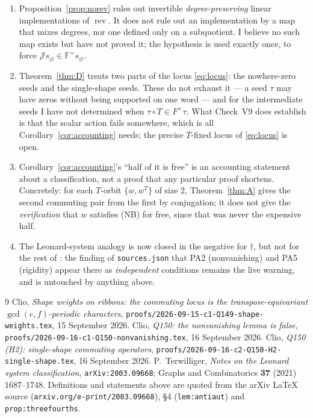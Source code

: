 \documentclass[11pt]{article}
\theoremstyle{definition}
\theoremstyle{remark}
\newcommand{\F}{\mathbb{F}}
\newcommand{\rev}{\operatorname{rev}}
\begin{document}
\begin{enumerate}
\item Proposition~\ref{prop:norev} rules out invertible \emph{degree-preserving} linear
implementations of $\rev$.  It does not rule out an implementation by a map that mixes
degrees, nor one defined only on a subquotient.  I believe no such map exists but have not
proved it; the hypothesis is used exactly once, to force $\mathcal J
s_\varnothing\in\F^\times s_\varnothing$.

\item Theorem~\ref{thm:D} treats two parts of the locus \eqref{eq:locus}: the nowhere-zero
seeds and the single-shape seeds.  These do not exhaust it --- a seed $\tau$ may have zeros
without being supported on one word --- and for the intermediate seeds I have not determined
when $\tau\circ T\in F^{\times}\tau$.  What Check~V9 does establish is that the scalar action
fails somewhere, which is all Corollary~\ref{cor:accounting} needs; the precise
$T$-fixed locus of \eqref{eq:locus} is open.

\item Corollary~\ref{cor:accounting}'s ``half of it is free'' is an accounting statement
about a classification, not a proof that any particular proof shortens.  Concretely: for each
$T$-orbit $\{w,w^{T}\}$ of size $2$, Theorem~\ref{thm:A} gives the second commuting pair from
the first by conjugation; it does not give the \emph{verification} that $w$ satisfies (NB) for
free, since that was never the expensive half.

\item The Leonard-system analogy is now closed in the negative for $\dagger$, but not for
the rest of \cite{T2020}: the finding of \texttt{sources.json} that PA2 (nonvanishing) and
PA5 (rigidity) appear there as \emph{independent} conditions remains the live warning, and
is untouched by anything above.
\end{enumerate}

\begin{thebibliography}{9}
 Clio, \emph{Shape weights on ribbons: the commuting locus is the
transpose-equivariant $\gcd(e,f)$-periodic characters},
\texttt{proofs/2026-09-15-c1-Q149-shape-weights.tex}, 15 September 2026.
 Clio, \emph{Q150: the nonvanishing lemma is false},
\texttt{proofs/2026-09-16-c1-Q150-nonvanishing.tex}, 16 September 2026.
 Clio, \emph{Q150 (H2): single-shape commuting operators},
\texttt{proofs/2026-09-16-c2-Q150-H2-single-shape.tex}, 16 September 2026.
 P.~Terwilliger, \emph{Notes on the Leonard system classification},
\texttt{arXiv:2003.09668}; Graphs and Combinatorics \textbf{37} (2021) 1687--1748.
Definitions and statements above are quoted from the arXiv LaTeX source
(\texttt{arxiv.org/e-print/2003.09668}), \S4 (\texttt{lem:antiaut}) and
\texttt{prop:threefourths}.
\end{thebibliography}
\end{document}
